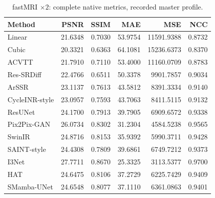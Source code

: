 \begin{table}[t]\centering\small
\caption{fastMRI $\times2$: complete native metrics, recorded master profile.}
\begin{tabular}{lrrrrr}\toprule Method&PSNR&SSIM&MAE&MSE&NCC\\\midrule
Linear & 21.6348 & 0.7030 & 53.9754 & 11591.9388 & 0.8732\\
Cubic & 20.3321 & 0.6363 & 64.1081 & 15236.6373 & 0.8370\\
ACVTT & 21.7910 & 0.7110 & 53.4000 & 11160.0709 & 0.8783\\
Res-SRDiff & 22.4766 & 0.6511 & 50.3378 & 9901.7857 & 0.9034\\
ArSSR & 23.1137 & 0.7613 & 43.5812 & 8391.3334 & 0.9140\\
CycleINR-style & 23.0957 & 0.7593 & 43.7063 & 8411.5115 & 0.9132\\
ResUNet & 24.1700 & 0.7913 & 39.7905 & 6909.6572 & 0.9338\\
Pix2Pix-GAN & 26.0734 & 0.8302 & 31.2304 & 4584.5238 & 0.9565\\
SwinIR & 24.8716 & 0.8153 & 35.9392 & 5990.3711 & 0.9428\\
SAINT-style & 24.4308 & 0.7809 & 39.6861 & 6749.7212 & 0.9373\\
I3Net & 27.7711 & 0.8670 & 25.3325 & 3113.5377 & 0.9700\\
HAT & 24.6475 & 0.8106 & 37.2729 & 6225.7429 & 0.9409\\
SMamba-UNet & 24.6548 & 0.8077 & 37.1110 & 6361.0863 & 0.9401\\
\bottomrule\end{tabular}\end{table}
